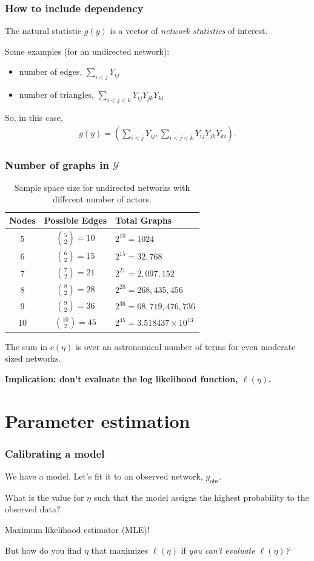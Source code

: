 \documentclass[ 10pt]{beamer}
\def\YY{{\mathcal Y}}
\newcommand{\yobs}{y_{\text{obs}}}
\begin{document}
\frame
{
\frametitle{How to include dependency}
The natural statistic $g(y)$ is a vector of \emph{network statistics} of interest.  
\vspace{2mm}

Some examples (for an undirected network):
\begin{itemize}
	\item number of edges, $\sum_{i<j} Y_{ij}$
	\item number of triangles, $\sum_{i < j < k} Y_{ij}Y_{jk}Y_{ki}$
\end{itemize}
\vspace{2mm}

So, in this case,
\begin{align*}
	g(y) = \left( \sum_{i<j} Y_{ij}, 
					\sum_{i < j < k} Y_{ij}Y_{jk}Y_{ki} \right ).
\end{align*}
}


\frame
{
\frametitle{Number of graphs in $\YY$}
\begin{table}[h] 
\caption{Sample space size for undirected networks with different number of 
actors.}

\begin{tabular}{ccl} 
\hline 
Nodes & Possible Edges & Total Graphs \\ [1ex]
\hline
5 & ${5 \choose 2} = 10$ & $2^{10} = 1024$ \\ [1ex]
6 & ${6 \choose 2} = 15$ & $2^{15} = 32,768$ \\ [1ex]
7 & ${7 \choose 2} = 21$ & $2^{21} = 2,097,152$ \\ [1ex]
8 & ${8 \choose 2} = 28$ & $2^{28} = 268,435,456$ \\ [1ex]
9 & ${9 \choose 2} = 36$ & $2^{36} = 68,719,476,736$ \\ [1ex]
10 & ${10 \choose 2} = 45$ & $2^{45} = 3.518437\times10^{13}$ \\ [1ex]
\hline 
\end{tabular} \label{T:number graphs}
\end{table}
\pause

The sum in $c(\eta)$ is over an astronomical number of terms for 
even moderate sized networks.
\vspace{2mm}

\textbf{Implication: don't evaluate the log likelihood function, $\ell(\eta)$.}
}

\section{Parameter estimation}
\frame
{
\frametitle{Calibrating a model}
We have a model. Let's fit it to an observed network, $\yobs$.
\vspace{3mm}

What is the value for $\eta$ such that the model assigns the highest probability to the observed data?
\vspace{2mm}

Maximum likelihood estimator (MLE)!
\vspace{10mm}

\pause
\large But how do you find $\eta$ that maximizes $\ell(\eta)$ if \emph{you can't 
evaluate $\ell(\eta)$?}
}
\end{document}
